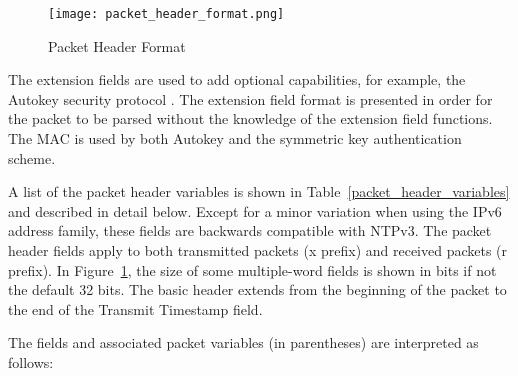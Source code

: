 \begin{figure}
\centering
\texttt{[image: packet\_header\_format.png]}
\caption{Packet Header Format}
\label{packet_header_format}
\end{figure}

The extension fields are used to add optional capabilities, for
example, the Autokey security protocol \cite{RFC5906}. The extension
field format is presented in order for the packet to be parsed
without the knowledge of the extension field functions. The MAC is
used by both Autokey and the symmetric key authentication scheme.

A list of the packet header variables is shown in Table~\ref{packet_header_variables} and
described in detail below. Except for a minor variation when using
the IPv6 address family, these fields are backwards compatible with
NTPv3. The packet header fields apply to both transmitted packets (x
prefix) and received packets (r prefix). In Figure~\ref{packet_header_format}, the size of
some multiple-word fields is shown in bits if not the default 32
bits. The basic header extends from the beginning of the packet to
the end of the Transmit Timestamp field.

The fields and associated packet variables (in parentheses) are
interpreted as follows:

